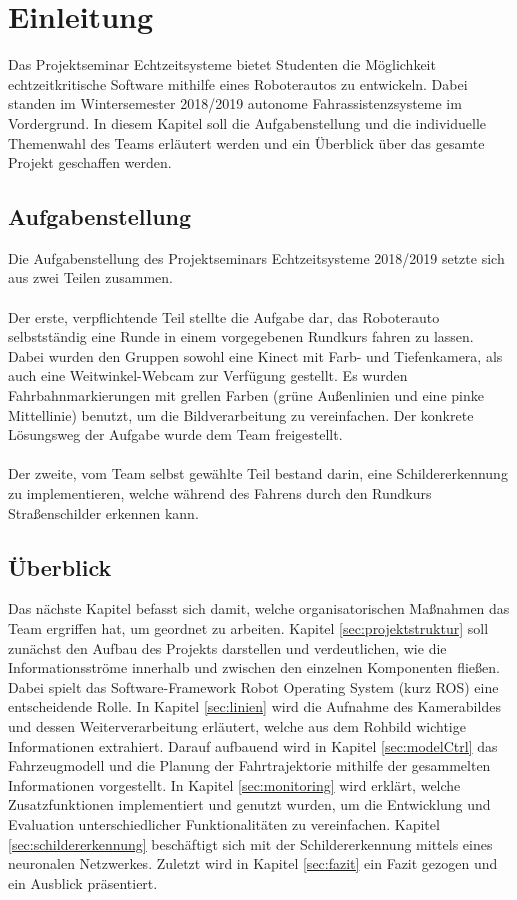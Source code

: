 \section{Einleitung}
\label{sec:einleitung}
Das Projektseminar Echtzeitsysteme bietet Studenten die M\"oglichkeit echtzeitkritische Software mithilfe eines Roboterautos zu entwickeln. Dabei standen im Wintersemester 2018/2019 autonome Fahrassistenzsysteme im Vordergrund. In diesem Kapitel soll die Aufgabenstellung und die individuelle Themenwahl des Teams erl\"autert werden und ein \"Uberblick \"uber das gesamte Projekt geschaffen werden.

\subsection{Aufgabenstellung}
Die Aufgabenstellung des Projektseminars Echtzeitsysteme 2018/2019 setzte sich aus zwei Teilen zusammen. \\\\
Der erste, verpflichtende Teil stellte die Aufgabe dar, das Roboterauto selbstst\"andig eine Runde in einem vorgegebenen Rundkurs fahren zu lassen. Dabei wurden den Gruppen sowohl eine Kinect mit Farb- und Tiefenkamera, als auch eine Weitwinkel-Webcam zur Verf\"ugung gestellt. Es wurden Fahrbahnmarkierungen mit grellen Farben (gr\"une Au\ss enlinien und eine pinke Mittellinie) benutzt, um die Bildverarbeitung zu vereinfachen. Der konkrete L\"osungsweg der Aufgabe wurde dem Team freigestellt. \\\\
Der zweite, vom Team selbst gew\"ahlte Teil bestand darin, eine Schildererkennung zu implementieren, welche w\"ahrend des Fahrens durch den Rundkurs Stra\ss{}enschilder erkennen kann.

\subsection{\"Uberblick}
Das n\"achste Kapitel befasst sich damit, welche organisatorischen Ma\ss{}nahmen das Team ergriffen hat, um geordnet zu arbeiten. Kapitel \ref{sec:projektstruktur} soll zun\"achst den Aufbau des Projekts darstellen und verdeutlichen, wie die Informationsstr\"ome innerhalb und zwischen den einzelnen Komponenten flie\ss{}en. Dabei spielt das Software-Framework Robot Operating System\cite{ROS} (kurz ROS) eine entscheidende Rolle. In Kapitel \ref{sec:linien} wird die Aufnahme des Kamerabildes und dessen Weiterverarbeitung erl\"autert, welche aus dem Rohbild wichtige Informationen extrahiert. Darauf aufbauend wird in Kapitel \ref{sec:modelCtrl} das Fahrzeugmodell und die Planung der Fahrtrajektorie mithilfe der gesammelten Informationen vorgestellt. In Kapitel \ref{sec:monitoring} wird erkl\"art, welche Zusatzfunktionen implementiert und genutzt wurden, um die Entwicklung und Evaluation unterschiedlicher Funktionalit\"aten zu vereinfachen. Kapitel \ref{sec:schildererkennung} besch\"aftigt sich mit der Schildererkennung mittels eines neuronalen Netzwerkes. Zuletzt wird in Kapitel \ref{sec:fazit} ein Fazit gezogen und ein Ausblick pr\"asentiert.